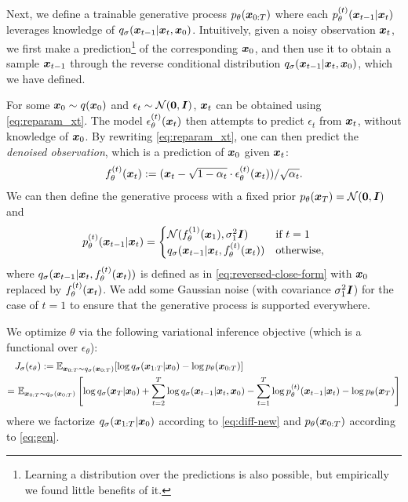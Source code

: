 Next, we define a trainable generative process $p_\theta({\bm{x}}_{0:T})$ where each $p_{\theta}^{(t)}({\bm{x}}_{t-1} | {\bm{x}}_t)$ %
 leverages knowledge of $q_\sigma({\bm{x}}_{t-1} | {\bm{x}}_{t}, {\bm{x}}_0)$. %
Intuitively, given a noisy observation ${\bm{x}}_t$, we first make a prediction\footnote{Learning a distribution over the predictions is also possible, but empirically we found little benefits of it.} of the corresponding ${\bm{x}}_0$, 
and then use it to obtain a sample ${\bm{x}}_{t-1}$ through the reverse conditional distribution $q_\sigma({\bm{x}}_{t-1} | {\bm{x}}_{t}, {\bm{x}}_0)$, which we have defined. %

For some ${\bm{x}}_0 \sim q({\bm{x}}_0)$ and $\epsilon_t \sim {\mathcal{N}}({\bm{0}}, {\bm{I}})$, 
${\bm{x}}_t$ can be obtained using \eqref{eq:reparam_xt}. The model $\epsilon_\theta^{(t)}({\bm{x}}_t)$ then attempts to predict $\epsilon_t$ from ${\bm{x}}_t$, without knowledge of ${\bm{x}}_0$.
By rewriting \eqref{eq:reparam_xt}, one can then predict the \textit{denoised observation}, which is a prediction of ${\bm{x}}_0$ given ${\bm{x}}_t$:
\begin{align}
    f_\theta^{(t)}({\bm{x}}_t) := ({\bm{x}}_t - \sqrt{1 - \alpha_t} \cdot \epsilon_{\theta}^{(t)}({\bm{x}}_t)) / \sqrt{\alpha_t}. \label{eq:x0-pred-def}
\end{align}
We can then define the generative process with a fixed prior $p_\theta({\bm{x}}_T) = {\mathcal{N}}({\bm{0}}, {\bm{I}})$ and
\begin{align}
    p_\theta^{(t)}({\bm{x}}_{t-1} | {\bm{x}}_t) = \begin{cases}
    {\mathcal{N}}(f_\theta^{(1)}({\bm{x}}_1), \sigma_1^2 {\bm{I}})  & \text{if} \ t = 1 \\
    q_\sigma({\bm{x}}_{t-1} | {\bm{x}}_t, f_{\theta}^{(t)}({\bm{x}}_t)) & \text{otherwise,}
    \end{cases} \label{eq:new-reverse}
\end{align}
where $q_\sigma({\bm{x}}_{t-1} | {\bm{x}}_t, f_{\theta}^{(t)}({\bm{x}}_t))$ is defined as in \eqref{eq:reversed-close-form} with ${\bm{x}}_0$ replaced by $f_{\theta}^{(t)}({\bm{x}}_t)$. %
We add some Gaussian noise (with covariance $\sigma_1^2 {\bm{I}}$) for the case of $t = 1$ to ensure that the generative process is supported everywhere. 

We optimize $\theta$ via the following variational inference objective (which is a functional over $\epsilon_\theta$):
\begin{align}
   & J_\sigma(\epsilon_\theta) :=
   \bb{E}_{\vx_{0:T} \sim q_\sigma(\vx_{0:T})}[\log q_\sigma(\vx_{1:T} | \vx_0) - \log p_\theta(\vx_{0:T})] \\
   = & \ \bb{E}_{\vx_{0:T} \sim q_\sigma(\vx_{0:T})} \left[\log q_\sigma(\vx_T | \vx_0) + \sum_{t=2}^{T} \log q_\sigma(\vx_{t-1} | \vx_t, \vx_0) - \sum_{t=1}^{T} \log p_\theta^{(t)}(\vx_{t-1} | \vx_t) - \log p_\theta(\vx_T) \right] \nonumber%
\end{align}
where we factorize $q_\sigma({\bm{x}}_{1:T} | {\bm{x}}_0)$ according to \eqref{eq:diff-new} and $p_\theta({\bm{x}}_{0:T})$ according to \eqref{eq:gen}.


